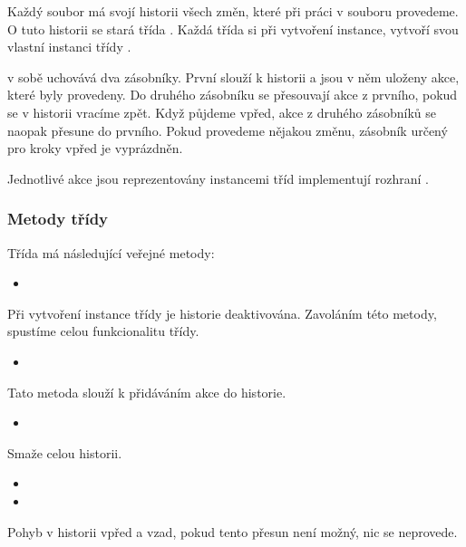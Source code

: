 \documentclass[
  field=inf,
  biblatex,
  glossaries,
  index
]{kidiplom}
\begin{document}
Každý soubor má svojí historii všech změn, které při práci v souboru provedeme. O tuto historii se stará třída . Každá třída  si při vytvoření instance, vytvoří svou vlastní instanci třídy .

 v sobě uchovává dva zásobníky. První slouží k historii a jsou v něm uloženy akce, které byly provedeny. Do druhého zásobníku se přesouvají akce z prvního, pokud se v historii vracíme zpět. Když půjdeme vpřed, akce z druhého zásobníků se naopak přesune do prvního. Pokud provedeme nějakou změnu, zásobník určený pro kroky vpřed je vyprázdněn.

Jednotlivé akce jsou reprezentovány instancemi tříd implementují rozhraní .

\subsubsection{Metody třídy}

Třída  má následující veřejné metody:

\begin{itemize}
\item {}
\end{itemize}
Při vytvoření instance třídy  je historie deaktivována. Zavoláním této metody, spustíme celou funkcionalitu třídy.

\begin{itemize}
\item {}
\end{itemize}
Tato metoda slouží k přidáváním akce do historie.

\begin{itemize}
\item {}
\end{itemize}
Smaže celou historii.

\begin{itemize}
\item {}
\item {}
\end{itemize}
Pohyb v historii vpřed a vzad, pokud tento přesun není možný, nic se neprovede.
\end{document}
